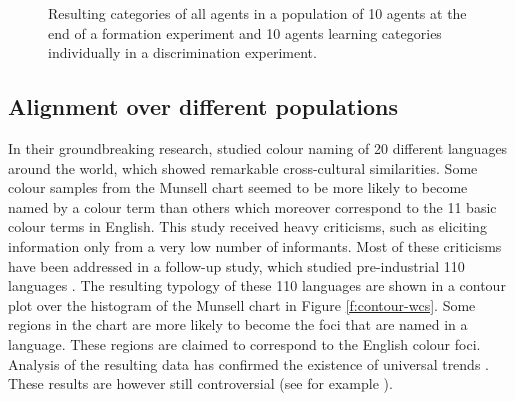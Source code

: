 \begin{figure}[htbp]
\centering
{}
\caption[Resulting categories of all agents in a population in a
formation experiment and a discrimination experiment]{Resulting
  categories of  all agents in
  a population of 10 agents at the end of a formation experiment and
   10 agents learning
  categories individually in a discrimination experiment.}
\label{f:language-categories}
\end{figure}

\subsection{Alignment over different populations}

In their groundbreaking research, \cite{berlin69basic} studied
colour naming of 20 different languages around the world, which showed
remarkable cross-cultural similarities. Some colour samples from the
Munsell chart seemed to be more likely to become named by a colour
term than others which moreover correspond to the 11 basic colour
terms in English. This study received heavy criticisms, such as
eliciting information only from a very low number of informants. Most
of these criticisms have been addressed in a follow-up study, which
studied pre-industrial 110 languages \citep{kay10world}. The resulting
typology of these 110 languages are shown in a contour plot over the
histogram of the Munsell chart in Figure \ref{f:contour-wcs}. Some
regions in the chart are more likely to become the foci that are named
in a language. These regions are claimed to correspond to the English
colour foci. Analysis of the resulting data has confirmed the
existence of universal trends \citep{regier05focal}. These results are
however still controversial (see for example \cite{roberson02color,
  roberson05color}).

